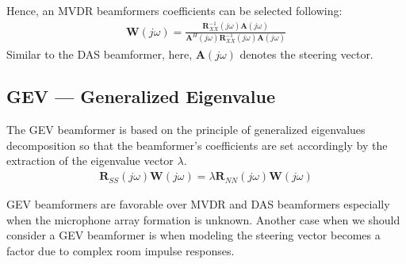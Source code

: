 Hence, an MVDR beamformers coefficients can be selected following:
\begin{align}
    \displaystyle\mathbf{W}(j\omega) = \frac{\mathbf{R}_{XX}^{-1}(j\omega)\mathbf{A}(j\omega)}{\mathbf{A}^H(j\omega)\mathbf{R}_{XX}^{-1}(j\omega)\mathbf{A}(j\omega)}
\end{align}
Similar to the DAS beamformer, here,
\(\mathbf{A}(j\omega)\) denotes the steering vector.

\subsection{GEV --- Generalized Eigenvalue}
The GEV beamformer is based on the principle of
generalized eigenvalues decomposition so that the beamformer's
coefficients are set accordingly by the extraction of 
the eigenvalue vector \(\lambda\). 
\begin{align}
    \mathbf{R}_{SS}(j\omega)\mathbf{W}(j\omega) = \lambda\mathbf{R}_{NN}(j\omega)\mathbf{W}(j\omega)
\end{align}

GEV beamformers are favorable over MVDR and DAS 
beamformers especially when
the microphone array formation is unknown.
Another case when we should consider a GEV beamformer
is when modeling the steering vector becomes 
a factor due to complex room impulse responses.






